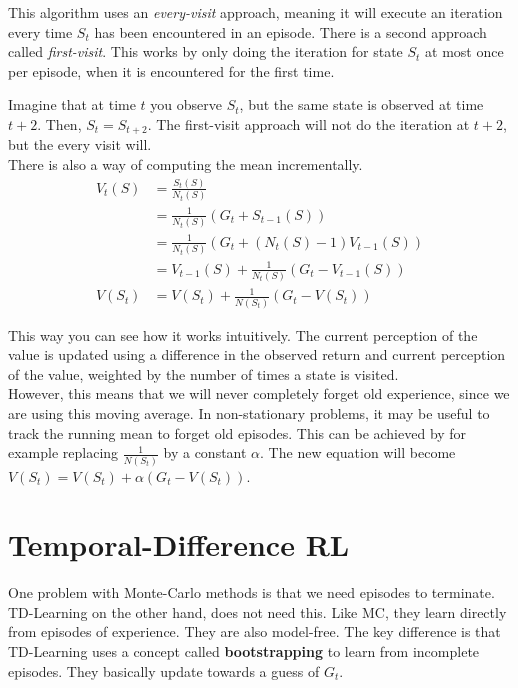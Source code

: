 This algorithm uses an \textit{every-visit} approach, meaning it will execute an iteration every time $S_t$ has been encountered in an episode. There is a second approach called \textit{first-visit}. This works by only doing the iteration for state $S_t$ at most once per episode, when it is encountered for the first time. 

Imagine that at time $t$ you observe $S_t$, but the same state is observed at time $t+2$. Then, $S_t = S_{t+2}$. The first-visit approach will not do the iteration at $t+2$, but the every visit will.\\

There is also a way of computing the mean incrementally.
\begin{equation*}
	\begin{aligned}
		V_t(S) & = \frac{S_t(S)}{N_t(S)}\\
			 & = \frac{1}{N_t(S)} (G_t + S_{t-1}(S))\\
			 & = \frac{1}{N_t(S)} (G_t + (N_t(S)-1)V_{t-1}(S))\\
			 & = V_{t-1}(S) + \frac{1}{N_t(S)} (G_t - V_{t-1}(S))\\
		V(S_t) & = V(S_t) + \frac{1}{N(S_t)} (G_t - V(S_t)) 
	\end{aligned}
\end{equation*}

This way you can see how it works intuitively. The current perception of the value is updated using a difference in the observed return and current perception of the value, weighted by the number of times a state is visited.\\

However, this means that we will never completely forget old experience, since we are using this moving average. In non-stationary problems, it may be useful to track the running mean to forget old episodes. This can be achieved by for example replacing $\frac{1}{N(S_t)}$ by a constant $\alpha$. The new equation will become $V(S_t) = V(S_t) + \alpha (G_t - V(S_t))$.

\section{Temporal-Difference RL}

One problem with Monte-Carlo methods is that we need episodes to terminate. TD-Learning on the other hand, does not need this. Like MC, they learn directly from episodes of experience. They are also model-free. The key difference is that TD-Learning uses a concept called \textbf{bootstrapping} to learn from incomplete episodes. They basically update towards a guess of $G_t$.\\


